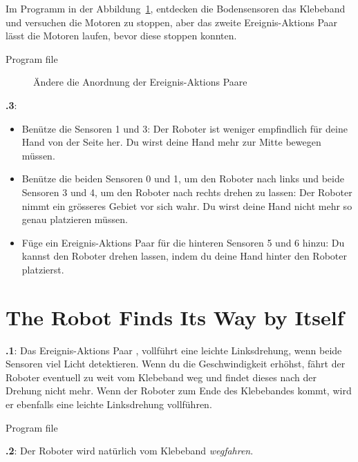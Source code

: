 \documentclass[12pt,a4paper,english]{article}
\begin{document}
Im Programm in der Abbildung~\ref{fig.change}, entdecken die Bodensensoren das Klebeband und versuchen die Motoren zu stoppen, aber das zweite Ereignis-Aktions Paar lässt die Motoren laufen, bevor diese stoppen konnten.

{\raggedleft \hfill Program file }

\begin{figure}[hbt]
\begin{center}
\caption{Ändere die Anordnung der Ereignis-Aktions Paare}\label{fig.change}
\end{center}
\end{figure}

\textbf{\thesection.3}: 
\begin{itemize}
\item Benütze die Sensoren 1 und 3: Der Roboter ist weniger empfindlich für deine Hand von der Seite her. Du wirst deine Hand mehr zur Mitte bewegen müssen.
\item Benütze die beiden Sensoren 0 und 1, um den Roboter nach links und beide Sensoren 3 und 4, um den Roboter nach rechts drehen zu lassen: Der Roboter nimmt ein grösseres Gebiet vor sich wahr. Du wirst deine Hand nicht mehr so genau platzieren müssen.

\item Füge ein Ereignis-Aktions Paar für die hinteren Sensoren 5 und 6 hinzu: Du kannst den Roboter drehen lassen, indem du deine Hand hinter den Roboter platzierst.
\end{itemize}


\section{The Robot Finds Its Way by Itself}


\textbf{\thesection.1}: Das Ereignis-Aktions Paar , vollführt eine leichte Linksdrehung, wenn beide Sensoren viel Licht detektieren. Wenn du die Geschwindigkeit erhöhst, fährt der Roboter eventuell zu weit vom Klebeband weg  und findet dieses nach der Drehung nicht mehr. Wenn der Roboter zum Ende des Klebebandes kommt, wird er ebenfalls eine leichte Linksdrehung vollführen.

{\raggedleft \hfill Program file }

\textbf{\thesection.2}: Der Roboter wird natürlich vom Klebeband \emph{wegfahren}.
\end{document}
